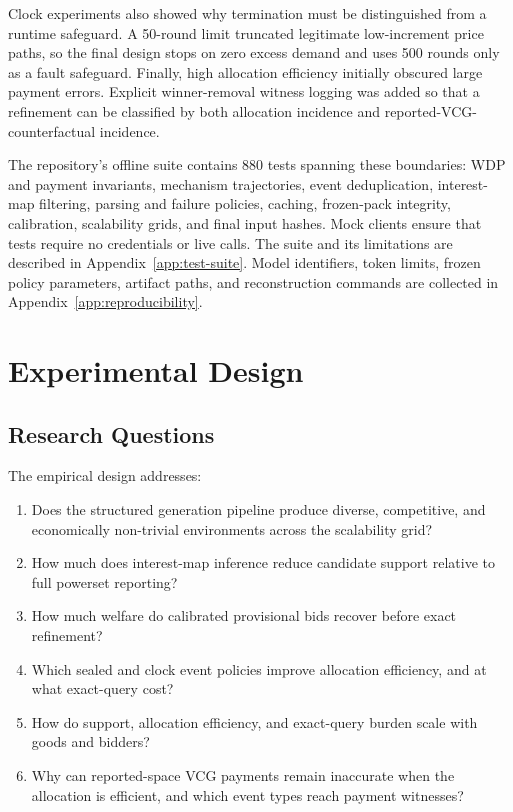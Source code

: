 Clock experiments also showed why termination must be distinguished from a
runtime safeguard. A 50-round limit truncated legitimate low-increment price
paths, so the final design stops on zero excess demand and uses 500 rounds only
as a fault safeguard. Finally, high allocation efficiency initially obscured
large payment errors. Explicit winner-removal witness logging was added so
that a refinement can be classified by both allocation incidence and
reported-VCG-counterfactual incidence.

The repository's offline suite contains 880 tests spanning these boundaries:
WDP and payment invariants, mechanism trajectories, event deduplication,
interest-map filtering, parsing and failure policies, caching, frozen-pack
integrity, calibration, scalability grids, and final input hashes. Mock
clients ensure that tests require no credentials or live calls. The suite and
its limitations are described in Appendix~\ref{app:test-suite}. Model
identifiers, token limits, frozen policy parameters, artifact paths, and
reconstruction commands are collected in
Appendix~\ref{app:reproducibility}.

\section{Experimental Design}

\subsection{Research Questions}

The empirical design addresses:
\begin{enumerate}[leftmargin=*]
    \item Does the structured generation pipeline produce diverse,
    competitive, and economically non-trivial environments across the
    scalability grid?
    \item How much does interest-map inference reduce candidate support
    relative to full powerset reporting?
    \item How much welfare do calibrated provisional bids recover before
    exact refinement?
    \item Which sealed and clock event policies improve allocation efficiency,
    and at what exact-query cost?
    \item How do support, allocation efficiency, and exact-query burden scale
    with goods and bidders?
    \item Why can reported-space VCG payments remain inaccurate when the
    allocation is efficient, and which event types reach payment witnesses?
\end{enumerate}

